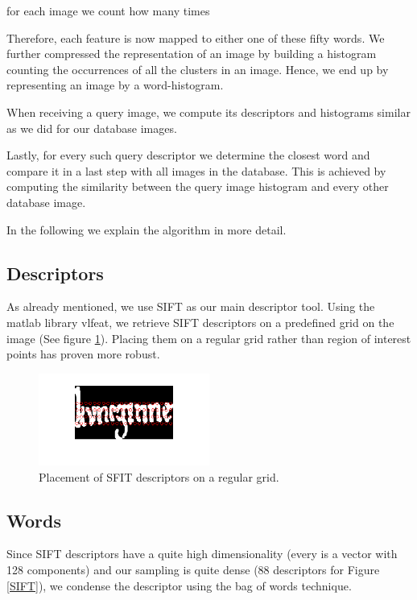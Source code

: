 \documentclass[conference]{IEEEtran}
\begin{document}
for each image we count how many times 

Therefore, each feature is now mapped to either one of these fifty words. We further compressed the representation of an image by building a histogram counting the occurrences of all the clusters in an image. Hence, we end up by representing an image by a word-histogram.

When receiving a query image, we compute its descriptors and histograms similar as we did for our database images. 

Lastly, for every such query descriptor we determine the closest word and compare 
it in a last step with all images in the database. This is achieved by computing the similarity between the query image histogram and every other database image.

In the following we explain the algorithm in more detail.

\subsection{Descriptors}
\label{sub:descriptors}
As already mentioned, we use SIFT as our main descriptor tool. Using the matlab library vlfeat\cite{vedaldi08vlfeat}, we retrieve SIFT descriptors on a predefined grid on the image (See figure \ref{fig:SIFT}). Placing them on a regular grid rather than region of interest points
has proven more robust.

\begin{figure}[!t]
\centering
\includegraphics[width=0.5\textwidth]{descriptor_placement}
\caption{Placement of SFIT descriptors on a regular grid.}
\label{fig:SIFT}
\end{figure}

\subsection{Words}
\label{sub:words}
Since SIFT descriptors have a quite high dimensionality (every is a vector with 128 components)
and our sampling is quite dense (88 descriptors for Figure \ref{SIFT}), we condense the
descriptor using the bag of words technique. 
\end{document}
